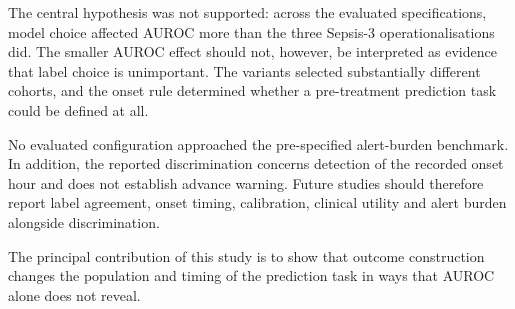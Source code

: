 The central hypothesis was not supported: across the evaluated
specifications, model choice affected AUROC more than the three Sepsis-3
operationalisations did. The smaller AUROC effect should not, however, be
interpreted as evidence that label choice is unimportant. The variants selected
substantially different cohorts, and the onset rule determined whether a
pre-treatment prediction task could be defined at all.

No evaluated configuration approached the pre-specified alert-burden
benchmark. In addition, the reported discrimination concerns detection of the
recorded onset hour and does not establish advance warning. Future studies
should therefore report label agreement, onset timing, calibration, clinical
utility and alert burden alongside discrimination.

The principal contribution of this study is to show that outcome construction
changes the population and timing of the prediction task in ways that AUROC
alone does not reveal.
